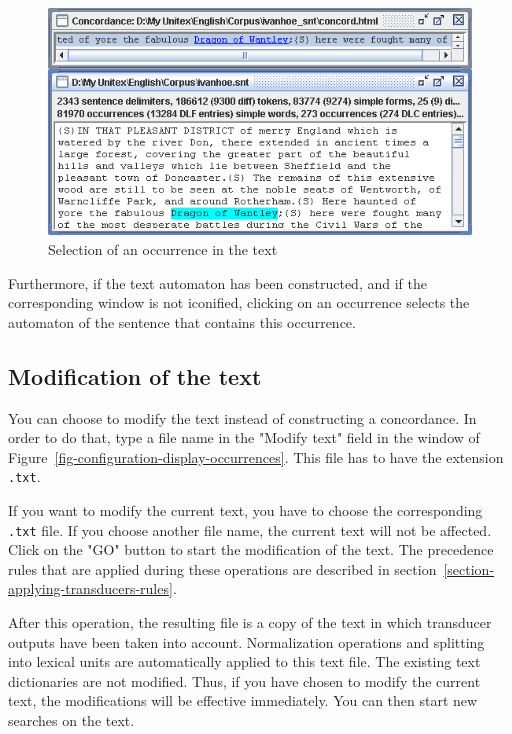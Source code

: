 \begin{figure}[h]
\begin{center}
\includegraphics[width=13.5cm]{resources/img/fig6-32.png}
\caption{Selection of an occurrence in the text\label{fig-back-to-text}}
\end{center}
\end{figure}

\noindent Furthermore, if the text automaton has been constructed, and if the
corresponding window is not iconified, clicking on an occurrence selects the automaton of the
sentence that contains this occurrence.

\subsection{Modification of the text}
\label{section-modifying-text}
You can choose to modify the text instead of constructing a concordance. In order
to do that, type a file name in the "Modify text" field in the window of
Figure~\ref{fig-configuration-display-occurrences}. This file has to have the
extension \verb+.txt+.

\bigskip
\noindent If you want to modify the current text, you have to choose the
corresponding \verb+.txt+ file. If you choose another file name, the current text will not be
affected. Click on the  "GO" button to start the modification of the text. The
precedence rules that are applied during these operations are described in
section~\ref{section-applying-transducers-rules}.

\bigskip
\noindent After this operation, the resulting file is a copy of the text
in which transducer outputs have been taken into account. Normalization
operations and splitting into lexical units are automatically applied to
this text file. The existing text dictionaries are not modified. Thus, if you
have chosen to modify the current text, the modifications will be effective
immediately. You can then start new searches on the text.

